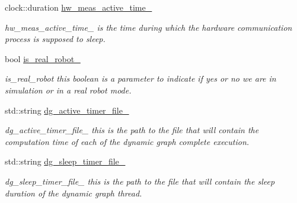\begin{DoxyCompactItemize}
clock\+::duration \hyperlink{classdynamic__graph_1_1DynamicGraphManager_af4c9ca6b9c161ac578b6726eaa7b7826}{hw\+\_\+meas\+\_\+active\+\_\+time\+\_\+}
\begin{DoxyCompactList}\small\item\em hw\+\_\+meas\+\_\+active\+\_\+time\+\_\+ is the time during which the hardware communication process is supposed to sleep. \end{DoxyCompactList}\item 
\mbox{\label{classdynamic__graph_1_1DynamicGraphManager_a81617144faf55e4ed2bf60165060b0f5}} 
bool \hyperlink{classdynamic__graph_1_1DynamicGraphManager_a81617144faf55e4ed2bf60165060b0f5}{is\+\_\+real\+\_\+robot\+\_\+}
\begin{DoxyCompactList}\small\item\em is\+\_\+real\+\_\+robot this boolean is a parameter to indicate if yes or no we are in simulation or in a real robot mode. \end{DoxyCompactList}\item 
\mbox{\label{classdynamic__graph_1_1DynamicGraphManager_a18c2cc959dceef659ab1f567e06254f7}} 
std\+::string \hyperlink{classdynamic__graph_1_1DynamicGraphManager_a18c2cc959dceef659ab1f567e06254f7}{dg\+\_\+active\+\_\+timer\+\_\+file\+\_\+}
\begin{DoxyCompactList}\small\item\em dg\+\_\+active\+\_\+timer\+\_\+file\+\_\+ this is the path to the file that will contain the computation time of each of the dynamic graph complete execution. \end{DoxyCompactList}\item 
\mbox{\label{classdynamic__graph_1_1DynamicGraphManager_af02dbc7fb67674937208abe4cd75d652}} 
std\+::string \hyperlink{classdynamic__graph_1_1DynamicGraphManager_af02dbc7fb67674937208abe4cd75d652}{dg\+\_\+sleep\+\_\+timer\+\_\+file\+\_\+}
\begin{DoxyCompactList}\small\item\em dg\+\_\+sleep\+\_\+timer\+\_\+file\+\_\+ this is the path to the file that will contain the sleep duration of the dynamic graph thread. \end{DoxyCompactList}\item 
\mbox{\label{classdynamic__graph_1_1DynamicGraphManager_a1a43bcf9c74648466d1e561203a39d87}} 

\end{DoxyCompactItemize}
